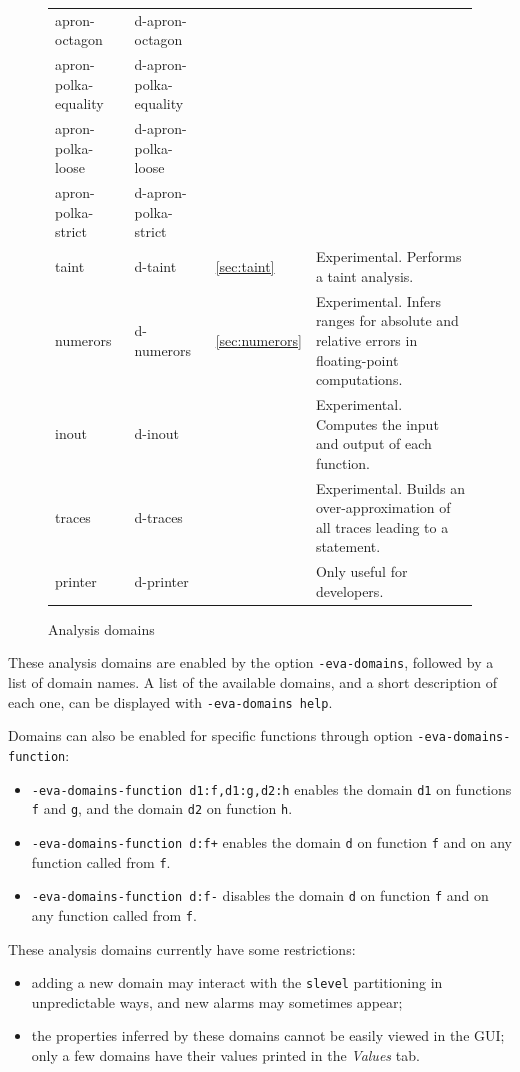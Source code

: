 \documentclass{frama-c-book}
\begin{document}
\begin{figure}
\begin{tabular}{lll>{\raggedright}m{7.5cm}}
    apron-octagon & d-apron-octagon &  & \tabularnewline
    apron-polka-equality & d-apron-polka-equality &  & \tabularnewline
    apron-polka-loose & d-apron-polka-loose &  & \tabularnewline
    apron-polka-strict & d-apron-polka-strict &  & \tabularnewline
    \midrule
    taint & d-taint & \ref{sec:taint} &
    Experimental. Performs a taint analysis.
    \tabularnewline
    \midrule
    numerors & d-numerors & \ref{sec:numerors} &
    Experimental. Infers ranges for absolute and relative errors
    in floating-point computations.
    \tabularnewline
    \midrule
    inout & d-inout &  &
    Experimental. Computes the input and output of each function.
    \tabularnewline
    \midrule
    traces & d-traces &  &
    Experimental. Builds an over-approximation of all traces leading to
    a statement.
    \tabularnewline
    \midrule
    printer & d-printer &  & Only useful for developers.
    \tabularnewline
    \bottomrule
  \end{tabular}

  \caption{Analysis domains \label{fig:eva-domains}}
\end{figure}

These analysis domains are enabled by the option \texttt{-eva-domains}, followed
by a list of domain names. A list of the available domains, and a short
description of each one, can be displayed with \texttt{-eva-domains help}.

Domains can also be enabled for specific functions through option
\texttt{-eva-domains-function}:
\begin{itemize}
\item \texttt{-eva-domains-function d1:f,d1:g,d2:h} enables the domain
  \texttt{d1} on functions \lstinline+f+ and \lstinline+g+, and the domain
  \texttt{d2} on function \lstinline+h+.
\item \texttt{-eva-domains-function d:f+} enables the domain
  \texttt{d} on function \lstinline+f+ and on any function called
  from \lstinline+f+.
\item \texttt{-eva-domains-function d:f-} disables the domain
  \texttt{d} on function \lstinline+f+ and on any function called
  from \lstinline+f+.
\end{itemize}

These analysis domains currently have some restrictions:
\begin{itemize}
\item adding a new domain may interact with the \lstinline+slevel+ partitioning
  in unpredictable ways, and new alarms may sometimes appear;
\item the properties inferred by these domains cannot be easily viewed in the
  GUI; only a few domains have their values printed in the \emph{Values} tab.
\end{itemize}
\end{document}

